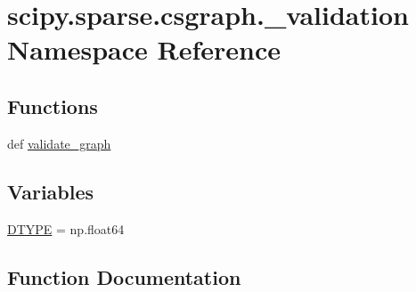 \hypertarget{namespacescipy_1_1sparse_1_1csgraph_1_1__validation}{}\section{scipy.\+sparse.\+csgraph.\+\_\+validation Namespace Reference}
\label{namespacescipy_1_1sparse_1_1csgraph_1_1__validation}
\subsection*{Functions}
\begin{DoxyCompactItemize}
\item 
def \hyperlink{namespacescipy_1_1sparse_1_1csgraph_1_1__validation_a8d95b95550058b9ad72c244318290fa1}{validate\+\_\+graph}
\end{DoxyCompactItemize}
\subsection*{Variables}
\begin{DoxyCompactItemize}
\item 
\hyperlink{namespacescipy_1_1sparse_1_1csgraph_1_1__validation_a520c4371f0b2fd2423b2014faa117d63}{D\+T\+Y\+P\+E} = np.\+float64
\end{DoxyCompactItemize}


\subsection{Function Documentation}
\hypertarget{namespacescipy_1_1sparse_1_1csgraph_1_1__validation_a8d95b95550058b9ad72c244318290fa1}{}
